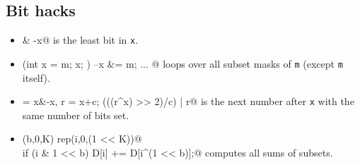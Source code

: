 	\subsection{Bit hacks}
		\begin{itemize}
			\item \verb@x & -x@ is the least bit in \texttt{x}.
			\item \verb@for (int x = m; x; ) { --x &= m; ... }@ loops over all subset masks of \texttt{m} (except \texttt{m} itself).
			\item \verb@c = x&-x, r = x+c; (((r^x) >> 2)/c) | r@ is the next number after \texttt{x} with the same number of bits set.
			\item \verb@rep(b,0,K) rep(i,0,(1 << K))@ \\ \verb@  if (i & 1 << b) D[i] += D[i^(1 << b)];@ computes all sums of subsets.
		\end{itemize}
